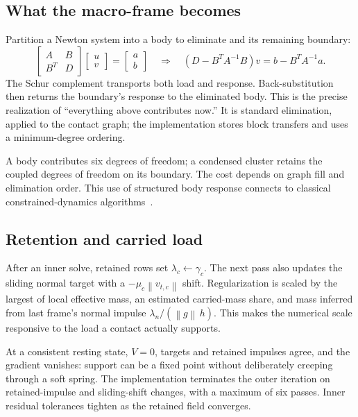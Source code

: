 \documentclass[10pt,letterpaper]{article}
\newcommand{\norm}[1]{\left\lVert#1\right\rVert}
\begin{document}
\subsection{What the macro-frame becomes}
Partition a Newton system into a body to eliminate and its remaining boundary:
\begin{equation}
 \begin{bmatrix}A&B\\B^T&D\end{bmatrix}
 \begin{bmatrix}u\\v\end{bmatrix}=
 \begin{bmatrix}a\\b\end{bmatrix}
 \quad\Longrightarrow\quad
 (D-B^TA^{-1}B)v=b-B^TA^{-1}a.
\end{equation}
The Schur complement transports both load and response. Back-substitution then returns the boundary's response to the eliminated body. This is the precise realization of ``everything above contributes now.'' It is standard elimination, applied to the contact graph; the implementation stores block transfers and uses a minimum-degree ordering.

A body contributes six degrees of freedom; a condensed cluster retains the coupled degrees of freedom on its boundary. The cost depends on graph fill and elimination order. This use of structured body response connects to classical constrained-dynamics algorithms~\cite{baraff}.

\subsection{Retention and carried load}
After an inner solve, retained rows set $\lambda_c\leftarrow\gamma_c$. The next pass also updates the sliding normal target with a $-\mu_c\norm{v_{t,c}}$ shift. Regularization is scaled by the largest of local effective mass, an estimated carried-mass share, and mass inferred from last frame's normal impulse $\lambda_n/(\norm g\,h)$. This makes the numerical scale responsive to the load a contact actually supports.

At a consistent resting state, $V=0$, targets and retained impulses agree, and the gradient vanishes: support can be a fixed point without deliberately creeping through a soft spring. The implementation terminates the outer iteration on retained-impulse and sliding-shift changes, with a maximum of six passes. Inner residual tolerances tighten as the retained field converges.
\end{document}
